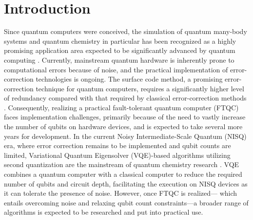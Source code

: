 \documentclass[aip-draft.tex]{subfiles}
\begin{document}
\section{Introduction}
Since quantum computers were conceived, the simulation of quantum many-body
systems and quantum chemistry in particular has been recognized as a highly
promising application area expected to be significantly advanced by quantum
computing \cite{Cao2019.doi:10.1021/acs.chemrev.8b00803}.
Currently, mainstream quantum hardware is inherently prone to computational
errors because of noise, and the practical implementation of error-correction
technologies is ongoing. The surface code method, a promising error-correction
technique for quantum computers, requires a significantly higher level of
redundancy compared with that required by classical error-correction methods
\cite{Fowler2012.PhysRevA.86.032324}. Consequently, realizing a practical
fault-tolerant quantum computer (FTQC) faces implementation challenges,
primarily because of the need to vastly increase the number of qubits on
hardware devices, and is expected to take several more years for development. In
the current Noisy Intermediate-Scale Quantum (NISQ) era, where error correction
remains to be implemented and qubit counts are limited, Variational Quantum
Eigensolver (VQE)-based algorithms utilizing second quantization are the
mainstream of quantum chemistry research \cite{peruzzo2014variational}. VQE
combines a quantum computer with a classical computer to reduce the required
number of qubits and circuit depth, facilitating the execution on NISQ devices
as it can tolerate the presence of noise. However, once FTQC is realized---
which entails overcoming noise  and relaxing qubit count constraints---a broader
range of algorithms is expected to be researched and put into practical use.
\end{document}
